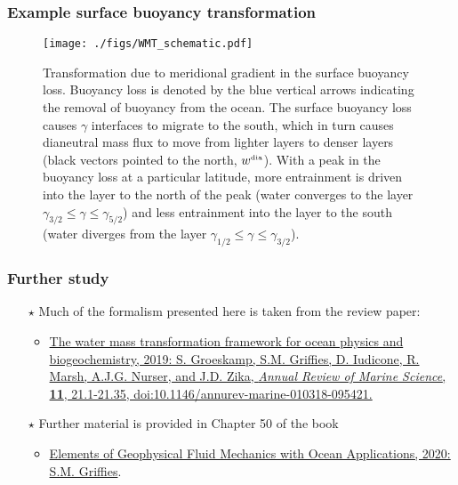 \documentclass[10pt]{beamer}
\begin{document}
\begin{frame}
  \frametitle{Example surface buoyancy transformation}
 
\begin{figure}
\centering
\texttt{[image: ./figs/WMT\_schematic.pdf]}
\caption{Transformation due to meridional gradient in the surface
  buoyancy loss. Buoyancy loss is denoted by the blue vertical arrows
  indicating the removal of buoyancy from the ocean. The surface
  buoyancy loss causes $\gamma$ interfaces to migrate to the south,
  which in turn causes dianeutral mass flux to move from lighter
  layers to denser layers (black vectors pointed to the north,
  $w^{\mbox{\tiny dia}}$). With a peak in the buoyancy loss at a
  particular latitude, more entrainment is driven into the layer to
  the north of the peak (water converges to the layer
  $\gamma_{3/2} \le \gamma \le \gamma_{5/2}$) and less entrainment
  into the layer to the south (water diverges from the layer
  $\gamma_{1/2} \le \gamma \le \gamma_{3/2}$).}
\label{fig:WMT_schematic}
\end{figure}


\end{frame}

\begin{frame}
  \frametitle{Further study}
 
\begin{itemize}

\item[$\star$] Much of the formalism presented here is taken from the
  review paper:
 \begin{itemize}
 \item
   \href{https://www.annualreviews.org/doi/abs/10.1146/annurev-marine-010318-095421}{The
     water mass transformation framework for ocean physics and
     biogeochemistry, 2019: S. Groeskamp, S.M. Grif\/f\/ies,
     D. Iudicone, R. Marsh, A.J.G. Nurser, and J.D. Zika, {\it Annual
       Review of Marine Science}, {\bf 11}, 21.1-21.35,
     doi:10.1146/annurev-marine-010318-095421.}
  \end{itemize}

\item[$\star$] Further material is provided in Chapter 50 of the
  book
 \begin{itemize}
 \item
   \href{https://stephengriffies.github.io/assets/pdfs/GFM\_lectures.pdf}{Elements
     of Geophysical Fluid Mechanics with Ocean Applications, 2020:
     S.M. Grif\/f\/ies}.
  \end{itemize}

\end{itemize}

\end{frame}
\end{document}
